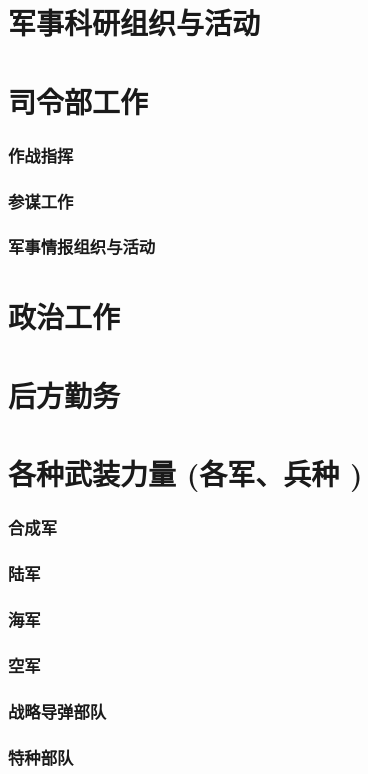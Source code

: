 \documentclass[UTF8]{../ApplicationUniverse}
\begin{document}
    \section{军事科研组织与活动}
    \section{司令部工作}
        \subsubsection{作战指挥}
        \subsubsection{参谋工作}
        \subsubsection{军事情报组织与活动}
    \section{政治工作}
    \section{后方勤务}
\section{各种武装力量 (各军、兵种 )}
    \subsubsection{合成军}
    \subsubsection{陆军}
    \subsubsection{海军}
    \subsubsection{空军}
    \subsubsection{战略导弹部队}
    \subsubsection{特种部队}
\end{document}
